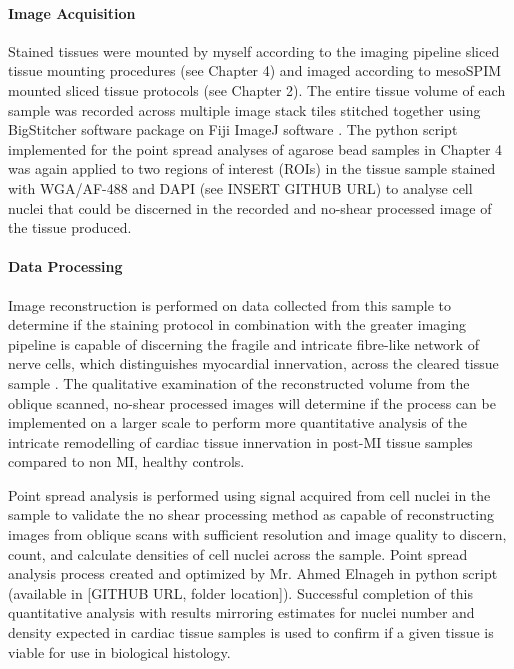 \paragraph{Image Acquisition}

Stained tissues were mounted by myself according to the imaging pipeline sliced tissue mounting procedures (see Chapter 4) and imaged according to mesoSPIM mounted sliced tissue protocols (see Chapter 2). The entire tissue volume of each sample was recorded across multiple image stack tiles stitched together using BigStitcher software package on Fiji ImageJ software \cite{horl_bigstitcher_2019}. The python script implemented for the point spread analyses of agarose bead samples in Chapter 4 was again applied to two regions of interest (ROIs) in the tissue sample stained with WGA/AF-488 and DAPI (see INSERT GITHUB URL) to analyse cell nuclei that could be discerned in the recorded and no-shear processed image of the tissue produced. 

\paragraph{Data Processing}

Image reconstruction is performed on data collected from this sample to determine if the staining protocol in combination with the greater imaging pipeline is capable of discerning the fragile and intricate fibre-like network of nerve cells, which distinguishes myocardial innervation, across the cleared tissue sample \cite{saltzman_biomedical_2015}. The qualitative examination of the reconstructed volume from the oblique scanned, no-shear processed images will determine if the process can be implemented on a larger scale to perform more quantitative analysis of the intricate remodelling of cardiac tissue innervation in post-MI tissue samples compared to non MI, healthy controls. 

Point spread analysis is performed using signal acquired from cell nuclei in the sample to validate the no shear processing method as capable of reconstructing images from oblique scans with sufficient resolution and image quality to discern, count, and calculate densities of cell nuclei across the sample. Point spread analysis process created and optimized by Mr. Ahmed Elnageh in python script (available in [GITHUB URL, folder location]). Successful completion of this quantitative analysis with results mirroring estimates for nuclei number and density expected in cardiac tissue samples is used to confirm if a given tissue is viable for use in biological histology. 




